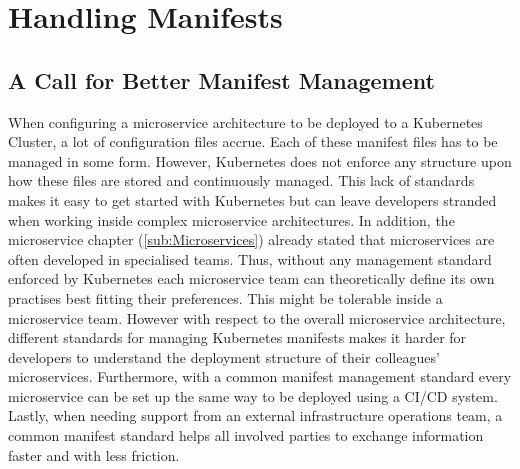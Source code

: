 
\section{Handling Manifests}%
\label{sec:Handling_Manifests}

\subsection{A Call for Better Manifest Management}%
\label{sub:A_Call_for_Better_Manifest_Management}
When configuring a microservice architecture to be deployed to a Kubernetes
Cluster, a lot of configuration files accrue. Each of these manifest files has
to be managed in some form. However, Kubernetes does not enforce any structure
upon how these files are stored and continuously managed. This lack of
standards makes it easy to get started with Kubernetes but can leave developers
stranded when working inside complex microservice architectures. In addition,
the microservice chapter (\ref{sub:Microservices}) already stated that
microservices are often developed in specialised teams. Thus, without any
management standard enforced by Kubernetes each microservice team can
theoretically define its own practises best fitting their preferences. This
might be tolerable inside a microservice team. However with respect to the
overall microservice architecture, different standards for managing Kubernetes
manifests makes it harder for developers to understand the deployment structure
of their colleagues' microservices. Furthermore, with a common manifest
management standard every microservice can be set up the same way to be
deployed using a \ac{CI}/\ac{CD} system. Lastly, when needing support from an
external infrastructure operations team, a common manifest standard helps all
involved parties to exchange information faster and with less friction.
